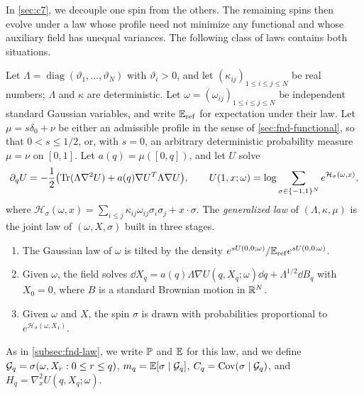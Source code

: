 In \cref{sec:c7}, we decouple one spin from the others. The remaining
spins then evolve under a law whose profile need not minimize any
functional and whose auxiliary field has unequal variances. The
following class of laws contains both situations.

\begin{definition}\label{def:gauss-law}
Let $\Lambda=\operatorname{diag}(\vartheta_1,\ldots,\vartheta_N)$ with
$\vartheta_i>0$, and let $(\kappa_{ij})_{1\le i\le j\le N}$ be real
numbers; $\Lambda$ and $\kappa$ are deterministic. Let
$\omega=(\omega_{ij})_{1\le i\le j\le N}$ be independent standard
Gaussian variables, and write $\mathbb E_{\rm ref}$ for expectation under their
law. Let $\mu=s\delta_0+\nu$ be either an admissible profile in the
sense of \cref{sec:fnd-functional}, so that $0<s\le1/2$, or, with
$s=0$, an arbitrary deterministic probability measure $\mu=\nu$ on
$[0,1]$. Let $a(q)=\mu([0,q])$, and let $U$ solve
\begin{equation}\label{eq:fnd-general-pde}
 \partial_qU=-\frac12\bigl(\operatorname{Tr}(\Lambda\nabla^2U)
      +a(q)\nabla U^T\Lambda\nabla U\bigr),\qquad
 U(1,x;\omega)=\log\sum_{\sigma\in\{-1,1\}^N}
     e^{\mathcal H_\sigma(\omega,x)},
\end{equation}
where
$\mathcal H_\sigma(\omega,x)=\sum_{i\le j}\kappa_{ij}\omega_{ij}\sigma_i\sigma_j+x\cdot\sigma$.
The \emph{generalized law} of $(\Lambda,\kappa,\mu)$ is the joint law of
$(\omega,X,\sigma)$ built in three stages.
\begin{enumerate}[label=(\roman*)]
\item The Gaussian law of $\omega$ is tilted by the density
$e^{sU(0,0;\omega)}/\mathbb E_{\rm ref}e^{sU(0,0;\omega)}$.
\item Given $\omega$, the field solves
$\dd X_q=a(q)\Lambda\nabla U(q,X_q;\omega)\dd q+\Lambda^{1/2}\dd B_q$
with $X_0=0$, where $B$ is a standard Brownian motion in $\mathbb R^N$.
\item Given $\omega$ and $X$, the spin $\sigma$ is drawn with
probabilities proportional to $e^{\mathcal H_\sigma(\omega,X_1)}$.
\end{enumerate}
As in \cref{subsec:fnd-law}, we write $\mathbb P$ and $\mathbb E$ for this law, and
we define $\mathcal G_q=\sigma(\omega,X_r:0\le r\le q)$,
$m_q=\mathbb E[\sigma\mid\mathcal G_q]$, $C_q=\operatorname{Cov}(\sigma\mid\mathcal G_q)$, and
$H_q=\nabla_x^2U(q,X_q;\omega)$.
\end{definition}

